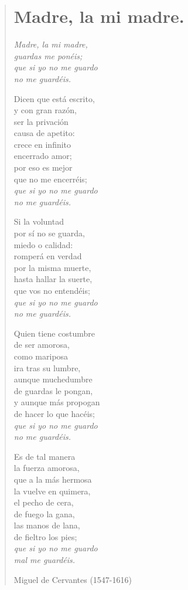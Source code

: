 \documentclass[12pt, twoside]{book}
\begin{document}
\newpage
\begin{verse}
\begin{center}
\section{Madre, la mi madre.}
\end{center}
\textit{Madre, la mi madre,\\
guardas me ponéis;\\
que si yo no me guardo\\
no me guardéis.}
\newline

Dicen que está escrito,\\
y con gran razón,\\
ser la privación\\
causa de apetito:\\
crece en infinito\\
encerrado amor;\\
por eso es mejor\\
que no me encerréis;\\
\textit{que si yo no me guardo\\
no me guardéis.}
\newline

Si la voluntad\\
por sí no se guarda,\\
miedo o calidad:\\
romperá en verdad\\
por la misma muerte,\\
hasta hallar la suerte,\\
que vos no entendéis;\\
\textit{que si yo no me guardo\\
no me guardéis.}
\newpage

Quien tiene costumbre\\
de ser amorosa,\\
como mariposa\\
ira tras su lumbre,\\
aunque muchedumbre\\
de guardas le pongan,\\
y aunque más propogan\\
de hacer lo que hacéis;\\
\textit{que si yo no me guardo\\
no me guardéis.}
\newline

Es de tal manera\\
la fuerza amorosa,\\
que a la más hermosa\\
la vuelve en quimera,\\
el pecho de cera,\\
de fuego la gana,\\
las manos de lana,\\
de fieltro los pies;\\
\textit{que si yo no me guardo\\
mal me guardéis.}
\newline

Miguel de Cervantes (1547-1616)
\end{verse}
\end{document}
